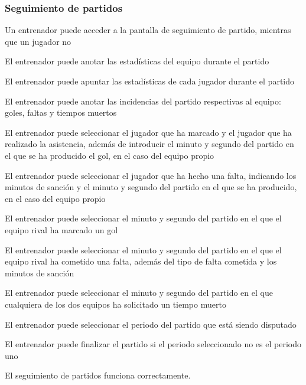 \subsubsection{Seguimiento de partidos}
\begin{description}[
    labelindent=2em,
    leftmargin=!,
    labelwidth=1.5cm,
    labelsep=1em,
    font=\normalfont
  ]
  \item[PU-18:] Un entrenador puede acceder a la pantalla de seguimiento de partido, mientras que un jugador no
  \item[PU-19:] El entrenador puede anotar las estadísticas del equipo durante el partido
  \item[PU-20:] El entrenador puede apuntar las estadísticas de cada jugador durante el partido
  \item[PU-21:] El entrenador puede anotar las incidencias del partido respectivas al equipo: goles, faltas y tiempos muertos
  \item[PU-22:] El entrenador puede seleccionar el jugador que ha marcado y el jugador que ha realizado la asistencia, además de introducir el minuto y segundo del partido en el que se ha producido el gol, en el caso del equipo propio
  \item[PU-23:] El entrenador puede seleccionar el jugador que ha hecho una falta, indicando los minutos de sanción y el minuto y segundo del partido en el que se ha producido, en el caso del equipo propio
  \item[PU-24:] El entrenador puede seleccionar el minuto y segundo del partido en el que el equipo rival ha marcado un gol
  \item[PU-25:] El entrenador puede seleccionar el minuto y segundo del partido en el que el equipo rival ha cometido una falta, además del tipo de falta cometida y los minutos de sanción
  \item[PU-26:] El entrenador puede seleccionar el minuto y segundo del partido en el que cualquiera de los dos equipos ha solicitado un tiempo muerto
  \item[PU-27:] El entrenador puede seleccionar el periodo del partido que está siendo disputado
  \item[PU-28:] El entrenador puede finalizar el partido si el periodo seleccionado no es el periodo uno
  \item[\textbf{Resultado obtenido:}] El seguimiento de partidos funciona correctamente.
\end{description}

